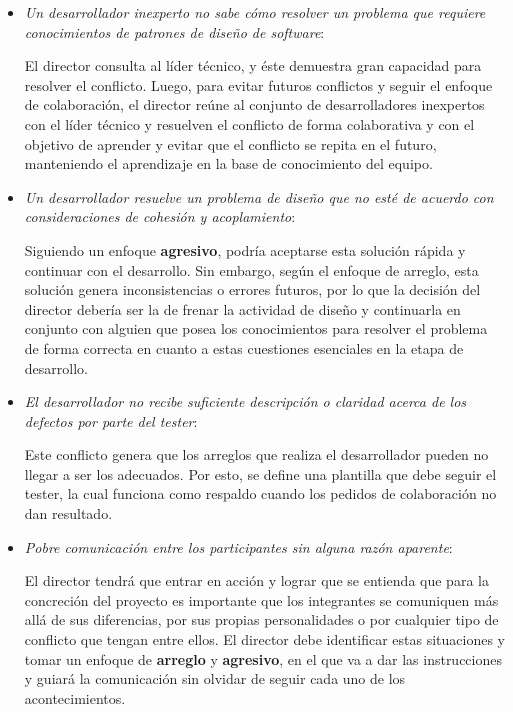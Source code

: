 \begin{itemize}

\item \textit{Un desarrollador inexperto no sabe cómo resolver un problema que requiere conocimientos de patrones de diseño de software}:

El director consulta al líder técnico, y éste demuestra gran capacidad para resolver el conflicto.
Luego, para evitar futuros conflictos y seguir el enfoque de colaboración, el director reúne al conjunto de desarrolladores inexpertos con el líder técnico y resuelven el conflicto de forma colaborativa y con el objetivo de aprender y evitar que el conflicto se repita en el futuro, manteniendo el aprendizaje en la base de conocimiento del equipo.

\item \textit{Un desarrollador resuelve un problema de diseño que no esté de acuerdo con consideraciones de cohesión y acoplamiento}:

Siguiendo un enfoque \textbf{agresivo}, podría aceptarse esta solución rápida y continuar con el desarrollo.
Sin embargo, según el enfoque de arreglo, esta solución genera inconsistencias o errores futuros, por lo que la decisión del director debería ser la de frenar la actividad de diseño y continuarla en conjunto con alguien que posea los conocimientos para resolver el problema de forma correcta en cuanto a estas cuestiones esenciales en la etapa de desarrollo.

\item \textit{El desarrollador no recibe suficiente descripción o claridad acerca de los defectos por parte del tester}:

Este conflicto genera que los arreglos que realiza el desarrollador pueden no llegar a ser los adecuados.
Por esto, se define una plantilla que debe seguir el tester, la cual funciona como respaldo cuando los pedidos de colaboración no dan resultado.

\item \textit{Pobre comunicación entre los participantes sin alguna razón aparente}:

El director tendrá que entrar en acción y lograr que se entienda que para la concreción del proyecto es importante que los integrantes se comuniquen más allá de sus diferencias, por sus propias personalidades o por cualquier tipo de conflicto que tengan entre ellos.
El director debe identificar estas situaciones y tomar un enfoque de \textbf{arreglo} y \textbf{agresivo}, en el que va a dar las instrucciones y guiará la comunicación sin olvidar de seguir cada uno de los acontecimientos.


\end{itemize}
